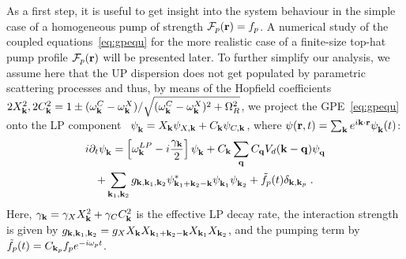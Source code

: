 As a first step, it is useful to get insight into the system behaviour
in the simple case of a homogeneous pump of strength
$\mathcal{F}_p({\mathbf r}) = f_p$. A numerical study of the coupled
equations~\eqref{eq:gpequ} for the more realistic case of a
finite-size top-hat pump profile $\mathcal{F}_p({\mathbf r})$ will be
presented later.
%
To further simplify our analysis, we assume here that the UP
dispersion does not get populated by parametric scattering processes
and thus, by means of the Hopfield coefficients $2X_{{\mathbf k}}^2,
2C_{{\mathbf k}}^2 = 1 \pm (\omega_{{\mathbf k}}^{C} -
\omega_{{\mathbf k}}^{X})/\sqrt{(\omega_{{\mathbf k}}^{C} -
  \omega_{{\mathbf k}}^{X})^2 + \Omega_R^2}$, we project the
GPE~\eqref{eq:gpequ} onto the LP
component~\cite{Ciuti_2001,Wouters_2007_b} $\psi_{{\mathbf k}}^{} =
X_{{\mathbf k}} \psi_{X,{\mathbf k}} + C_{{\mathbf k}} \psi_{C,{\mathbf k}}$,
where $\psi({\mathbf r},t) = \sum_{{\mathbf k}} e^{i{\mathbf k}\cdot {\mathbf r}}
\psi_{{\mathbf k}}^{} (t)$:
%
\begin{multline}
  i\partial_t \psi_{{\mathbf k}}^{} = \left[\omega_{{\mathbf k}}^{LP} -
    i\displaystyle\frac{\gamma_{{\mathbf k}}}{2}\right]\psi_{{\mathbf k}}^{} +
  C_{{\mathbf k}} \sum_{{\mathbf q}} C_{{\mathbf q}} V_d({\mathbf k} - {\mathbf q})
  \psi_{{\mathbf q}}^{}\\ + \sum_{{\mathbf k}_1, {\mathbf k}_2} g_{{\mathbf k},
    {\mathbf k}_1, {\mathbf k}_2} \psi^*_{{\mathbf k}_1 + {\mathbf k}_2-{\mathbf k}}
  \psi_{{\mathbf k}_1}^{} \psi_{{\mathbf k}_2}^{} + \tilde{f}_p(t)
  \delta_{{\mathbf k},{\mathbf k}_p}\; .
\label{eq:efflp}
\end{multline}
%
Here, $\gamma_{{\mathbf k}}=\gamma_X X_{{\mathbf k}}^2 + \gamma_C
C_{{\mathbf k}}^2$ is the effective LP decay rate, the interaction
strength is given by $g_{{\mathbf k}, {\mathbf k}_1, {\mathbf k}_2}=g_X
X_{{\mathbf k}} X_{{\mathbf k}_1 + {\mathbf k}_2-{\mathbf k}} X_{{\mathbf k}_1}
X_{{\mathbf k}_2}$, and the pumping term by $\tilde{f}_p(t)=
C_{{\mathbf k}_p} f_p e^{-i\omega_p t}$.


